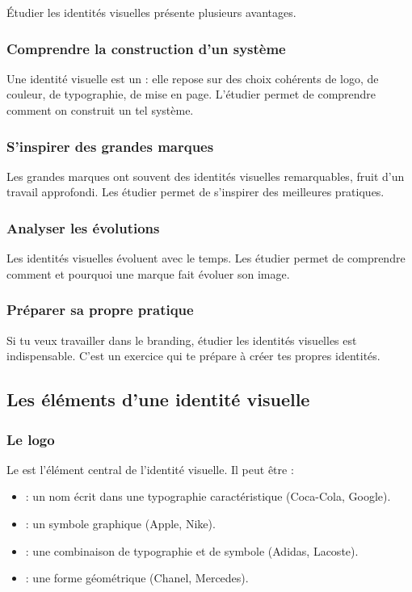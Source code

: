 Étudier les identités visuelles présente plusieurs avantages.

\subsubsection{Comprendre la construction d'un système}

Une identité visuelle est un  : elle repose sur des choix cohérents de logo, de couleur, de typographie, de mise en page. L'étudier permet de comprendre comment on construit un tel système.

\subsubsection{S'inspirer des grandes marques}

Les grandes marques ont souvent des identités visuelles remarquables, fruit d'un travail approfondi. Les étudier permet de s'inspirer des meilleures pratiques.

\subsubsection{Analyser les évolutions}

Les identités visuelles évoluent avec le temps. Les étudier permet de comprendre comment et pourquoi une marque fait évoluer son image.

\subsubsection{Préparer sa propre pratique}

Si tu veux travailler dans le branding, étudier les identités visuelles est indispensable. C'est un exercice qui te prépare à créer tes propres identités.

\subsection{Les éléments d'une identité visuelle}

\subsubsection{Le logo}

Le  est l'élément central de l'identité visuelle. Il peut être :

\begin{itemize}
    \item {} : un nom écrit dans une typographie caractéristique (Coca-Cola, Google).
    \item {} : un symbole graphique (Apple, Nike).
    \item {} : une combinaison de typographie et de symbole (Adidas, Lacoste).
    \item {} : une forme géométrique (Chanel, Mercedes).
\end{itemize}

